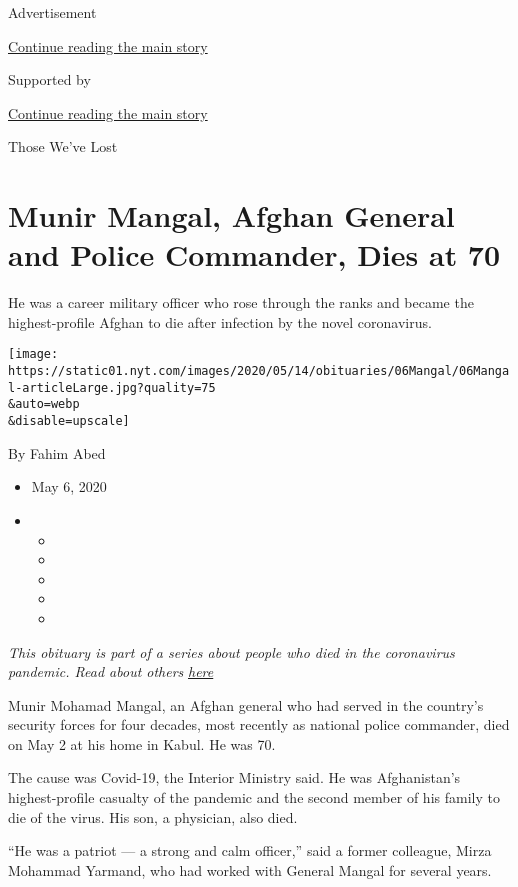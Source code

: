 Advertisement

\protect\hyperlink{after-top}{Continue reading the main story}

Supported by

\protect\hyperlink{after-sponsor}{Continue reading the main story}

Those We've Lost

\hypertarget{munir-mangal-afghan-general-and-police-commander-dies-at-70}{%
\section{Munir Mangal, Afghan General and Police Commander, Dies at
70}\label{munir-mangal-afghan-general-and-police-commander-dies-at-70}}

He was a career military officer who rose through the ranks and became
the highest-profile Afghan to die after infection by the novel
coronavirus.

\texttt{[image: https://static01.nyt.com/images/2020/05/14/obituaries/06Mangal/06Mangal-articleLarge.jpg?quality=75\\\&auto=webp\\\&disable=upscale]}

By Fahim Abed

\begin{itemize}
\item
  May 6, 2020
\item
  \begin{itemize}
  \item
  \item
  \item
  \item
  \item
  \end{itemize}
\end{itemize}

\emph{This obituary is part of a series about people who died in the
coronavirus pandemic. Read about others}
\href{https://www.nytimes.com/series/people-who-have-died-of-the-coronavirus}{\emph{here}}

Munir Mohamad Mangal, an Afghan general who had served in the country's
security forces for four decades, most recently as national police
commander, died on May 2 at his home in Kabul. He was 70.

The cause was Covid-19, the Interior Ministry said. He was Afghanistan's
highest-profile casualty of the pandemic and the second member of his
family to die of the virus. His son, a physician, also died.

``He was a patriot --- a strong and calm officer,'' said a former
colleague, Mirza Mohammad Yarmand, who had worked with General Mangal
for several years.

